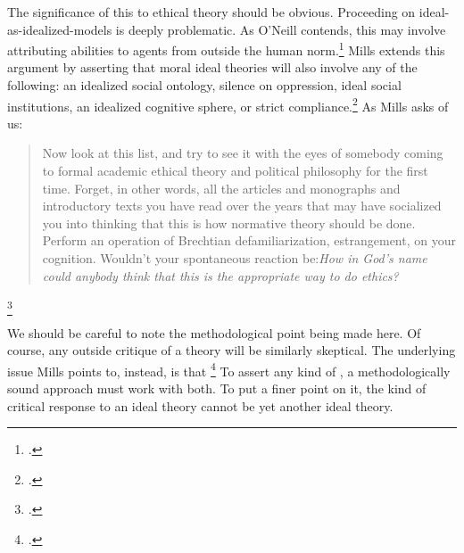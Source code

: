 \documentclass[letterpaper,notitlepage,12pt]{article}
\begin{document}
The significance of this to ethical theory should be obvious.
Proceeding on ideal-as-idealized-models is deeply problematic.
As O'Neill contends, this may involve attributing abilities to agents from
outside the human norm.\footcite[p. 56]{oneill_abstraction_1987}
Mills extends this argument by asserting that moral ideal theories will also
involve any of the following: an idealized social ontology, silence on
oppression, ideal social institutions, an idealized cognitive sphere, or strict
compliance.\footcite[p. 168-9]{mills_ideal_2005}
As Mills asks of us: \blockquote{Now look at
  this list, and try to see it with the eyes of somebody coming to formal
  academic ethical theory and political philosophy for the first time. Forget,
  in other words, all the articles and monographs and introductory texts you
  have read over the years that may have socialized you into thinking that this
  is how normative theory should be done. Perform an operation of Brechtian
  defamiliarization, estrangement, on your cognition. Wouldn't your spontaneous
  reaction be:\textit{How in God's name could anybody think that this is the
appropriate way to do ethics?}}\footcite[p. 169]{mills_ideal_2005}

We should be careful to note the methodological point being made here.
Of course, any outside critique of a theory will be similarly skeptical.
The underlying issue Mills points to, instead, is that \footcite[p. 167]{mills_ideal_2005}
To assert any kind of , a methodologically sound approach must 
work with both.
To put a finer point on it, the kind of critical response to an ideal theory
cannot be yet another ideal theory.
\end{document}
